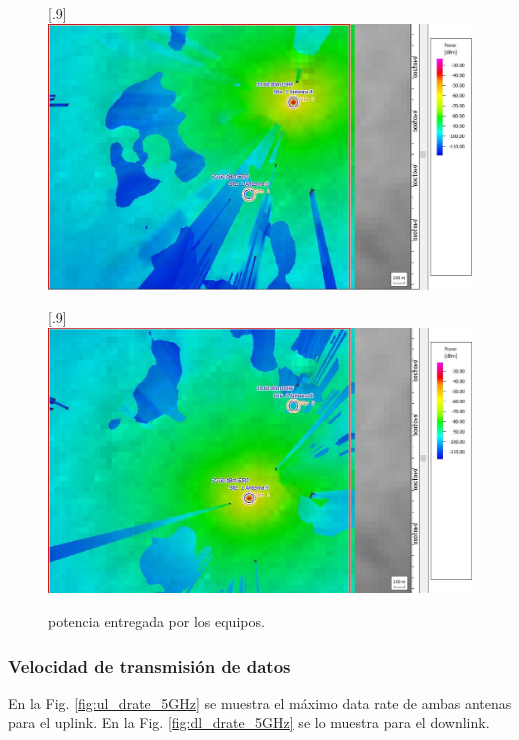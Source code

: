\documentclass[11pt,a4paper]{article}
\begin{document}
\begin{figure}[ht!]
  \centering
  [.9\linewidth]{\includegraphics[height=14\baselineskip]{fotos_ema/pot_trans_eq_1_5GHz.jpg}}

  [.9\linewidth]{\includegraphics[height=14\baselineskip]{fotos_ema/pot_trans_eq_2_5GHz.jpg}}
  \caption{potencia entregada por los equipos.}
  \label{fig:pot_trans_5GHz}
\end{figure}


\subsubsection{Velocidad de transmisión de datos}

En la Fig. \ref{fig:ul_drate_5GHz} se muestra el máximo data rate de ambas antenas para el uplink. En la Fig. \ref{fig:dl_drate_5GHz} se lo muestra para el downlink.
\end{document}
